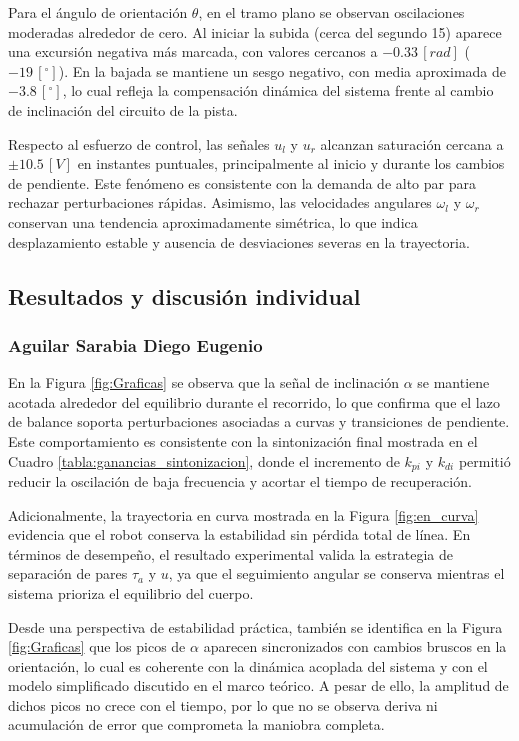 \documentclass{article}
\begin{document}
Para el ángulo de orientación $\theta$, en el tramo plano se observan oscilaciones moderadas alrededor de cero. Al iniciar
la subida (cerca del segundo 15) aparece una excursión negativa más marcada, con valores cercanos a $-0.33\,[rad]$
($-19\,[{}^\circ]$). En la bajada se mantiene un sesgo negativo, con media aproximada de $-3.8\,[{}^\circ]$, lo cual refleja la
compensación dinámica del sistema frente al cambio de inclinación del circuito de la pista.

Respecto al esfuerzo de control, las señales $u_l$ y $u_r$ alcanzan saturación cercana a $\pm10.5\,[V]$ en instantes
puntuales, principalmente al inicio y durante los cambios de pendiente. Este fenómeno es consistente con la demanda de alto
par para rechazar perturbaciones rápidas. Asimismo, las velocidades angulares $\omega_l$ y $\omega_r$ conservan una
tendencia aproximadamente simétrica, lo que indica desplazamiento estable y ausencia de desviaciones severas en la
trayectoria.

\subsection {Resultados y discusión individual}

\subsubsection{Aguilar Sarabia Diego Eugenio}
En la Figura \ref{fig:Graficas} se observa que la señal de inclinación $\alpha$ se mantiene acotada alrededor del equilibrio durante el recorrido, lo que confirma que el lazo de balance soporta perturbaciones asociadas a curvas y transiciones de pendiente. Este comportamiento es consistente con la sintonización final mostrada en el Cuadro \ref{tabla:ganancias_sintonizacion}, donde el incremento de $k_{pi}$ y $k_{di}$ permitió reducir la oscilación de baja frecuencia y acortar el tiempo de recuperación.

Adicionalmente, la trayectoria en curva mostrada en la Figura \ref{fig:en_curva} evidencia que el robot conserva la estabilidad sin pérdida total de línea. En términos de desempeño, el resultado experimental valida la estrategia de separación de pares $\tau_a$ y $u$, ya que el seguimiento angular se conserva mientras el sistema prioriza el equilibrio del cuerpo.

Desde una perspectiva de estabilidad práctica, también se identifica en la Figura \ref{fig:Graficas} que los picos de $\alpha$ aparecen sincronizados con cambios bruscos en la orientación, lo cual es coherente con la dinámica acoplada del sistema y con el modelo simplificado discutido en el marco teórico. A pesar de ello, la amplitud de dichos picos no crece con el tiempo, por lo que no se observa deriva ni acumulación de error que comprometa la maniobra completa.
\end{document}
